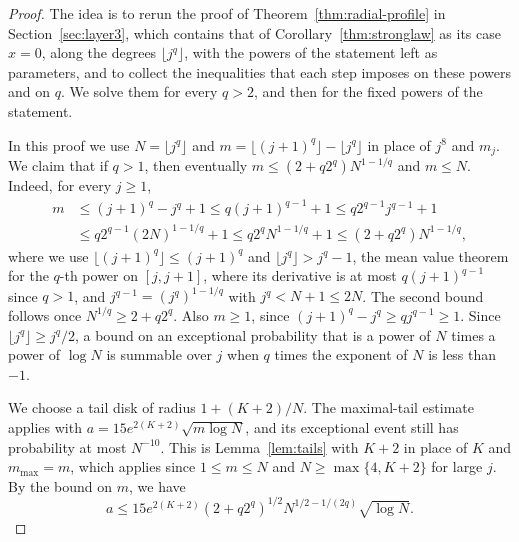\begin{proof}
The idea is to rerun the proof of Theorem~\ref{thm:radial-profile} in
Section~\ref{sec:layer3}, which contains that of
Corollary~\ref{thm:stronglaw} as its case $x=0$, along the
degrees $\lfloor j^q\rfloor$, with the powers of the statement left as
parameters, and to collect the inequalities that each step imposes on
these powers and on $q$. We solve them for every $q>2$, and then for the
fixed powers of the statement.

In this proof we use $N=\lfloor j^q\rfloor$ and
$m=\lfloor(j+1)^q\rfloor-\lfloor j^q\rfloor$ in place of $j^8$ and $m_j$.
We claim that if $q>1$, then eventually $m\le(2+q2^q)N^{1-1/q}$ and
$m\le N$. Indeed, for every $j\ge1$,
\begin{align*}
 m&\le(j+1)^q-j^q+1\le q(j+1)^{q-1}+1\le q2^{q-1}j^{q-1}+1\\
 &\le q2^{q-1}(2N)^{1-1/q}+1\le q2^qN^{1-1/q}+1\le(2+q2^q)N^{1-1/q},
\end{align*}
where we use $\lfloor(j+1)^q\rfloor\le(j+1)^q$ and
$\lfloor j^q\rfloor>j^q-1$, the mean value theorem for the $q$-th power on
$[j,j+1]$, where its derivative is at most $q(j+1)^{q-1}$ since $q>1$,
and $j^{q-1}=(j^q)^{1-1/q}$ with $j^q<N+1\le2N$. The second bound
follows once $N^{1/q}\ge2+q2^q$. Also $m\ge1$, since
$(j+1)^q-j^q\ge qj^{q-1}\ge1$.
Since $\lfloor j^q\rfloor\ge j^q/2$, a bound on an exceptional
probability that is a power of $N$ times a power of $\log N$ is summable
over $j$ when $q$ times the exponent of $N$ is less than $-1$.

We choose a tail disk of radius $1+(K+2)/N$.
The maximal-tail estimate applies with
$a=15e^{2(K+2)}\sqrt{m\log N}$, and its exceptional event still has
probability at most $N^{-10}$. This is Lemma~\ref{lem:tails} with $K+2$
in place of $K$ and $m_{\max}=m$, which applies since $1\le m\le N$ and
$N\ge\max\{4,K+2\}$ for large $j$. By the bound on $m$, we have
\[
 a\le15e^{2(K+2)}(2+q2^q)^{1/2}N^{1/2-1/(2q)}\sqrt{\log N}.
\]


\end{proof}
